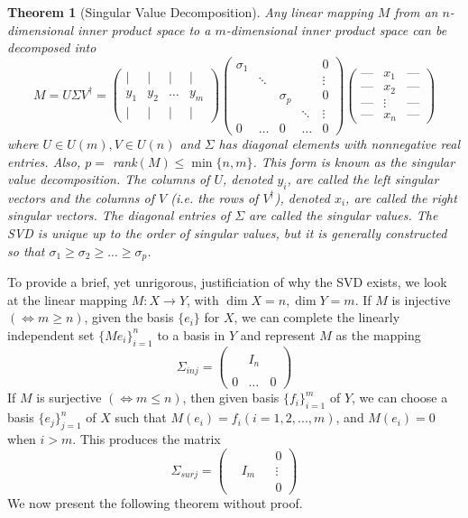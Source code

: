 \documentclass{article}
\newtheorem{theorem}{Theorem}[section]
\theoremstyle{remark}
\theoremstyle{definition}
\begin{document}
    \begin{theorem}[Singular Value Decomposition]
    Any linear mapping $M$ from an $n$-dimensional inner product space to a $m$-dimensional inner product space can be decomposed into 
    \[ M = U \Sigma V^\dagger = \begin{pmatrix}
     \vert & \vert & \vert & \vert\\
    y_1 & y_2 & \ldots & y_m \\
    \vert & \vert & \vert & \vert
    \end{pmatrix}\begin{pmatrix}
    \sigma_1 & & & &0\\
    &\ddots &&& \vdots \\
    & & \sigma_p & & 0\\
    & & & \ddots &\vdots \\
    0 & \ldots &0& \ldots &0
    \end{pmatrix} \begin{pmatrix}
    \text{---}&x_1&\text{---} \\
    \text{---}&x_2&\text{---} \\
    \text{---}&\vdots&\text{---} \\
    \text{---}&x_n&\text{---}
    \end{pmatrix} \]
    where $U \in U(m), V \in U(n)$ and $\Sigma$ has diagonal elements with nonnegative real entries. Also, $p = $ rank$(M) \leq \min{\{n,m\}}$. This form is known as the \textit{singular value decomposition}. The columns of $U$, denoted $y_i$, are called the \textit{left singular vectors} and the columns of $V$ (i.e. the rows of $V^\dagger$), denoted $x_i$, are called the \textit{right singular vectors}. The diagonal entries of $\Sigma$ are called the \textit{singular values}. The SVD is unique up to the order of singular values, but it is generally constructed so that $\sigma_1 \geq \sigma_2 \geq ... \geq \sigma_p$. 
    \end{theorem}

    To provide a brief, yet unrigorous, justificiation of why the SVD exists, we look at the linear mapping $M: X \longrightarrow Y$, with $\dim{X} = n, \dim{Y} = m$. If $M$ is injective $(\iff m \geq n)$, given the basis $\{e_i\}$ for $X$, we can complete the linearly independent set $\{Me_i\}_{i=1}^n$ to a basis in $Y$ and represent $M$ as the mapping
    \[\Sigma_{inj} = \begin{pmatrix}
    &&\\
    &I_n&\\
    &&\\
    0&\ldots &0
    \end{pmatrix}\]
    If $M$ is surjective $(\iff m \leq n)$, then given basis $\{f_i\}_{i=1}^m$ of $Y$, we can choose a basis $\{e_j\}_{j=1}^n$ of $X$ such that $M(e_i) = f_i (i = 1, 2, ..., m)$, and $M(e_i) = 0$ when $i > m$. This produces the matrix
    \[\Sigma_{surj} = \begin{pmatrix}
    &&&0\\&I_m&& \vdots \\&&&0\end{pmatrix}\]
    We now present the following theorem without proof. 
\end{document}
